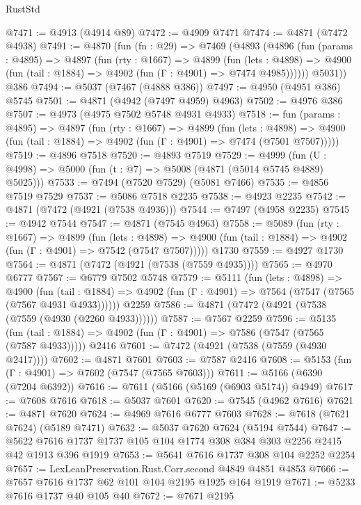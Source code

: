 \begin{lexlean}{RustStd}
\begin{coremodule}
@7471 := @4913 (@4914 @89)
@7472 := @4909 @7471
@7474 := @4871 (@7472 @4938)
@7491 := @4870
    (fun (fn : @29) =>
    @7469
      (@4893
        (@4896
          (fun (params : @4895) =>
          @4897
            (fun (rty : @1667) =>
            @4899
              (fun (lets : @4898) =>
              @4900 (fun (tail : @1884) => @4902 (fun (Γ : @4901) => @7474 @4985))))))
        @5031))
    @386
@7494 := @5037 (@7467 (@4888 @386))
@7497 := @4950 (@4951 @386) @5745
@7501 := @4871 (@4942 (@7497 @4959) @4963)
@7502 := @4976 @386
@7507 := @4973 (@4975 @7502 @5748 @4931 @4933)
@7518 := fun (params : @4895) =>
  @4897
    (fun (rty : @1667) =>
    @4899
      (fun (lets : @4898) =>
      @4900 (fun (tail : @1884) => @4902 (fun (Γ : @4901) => @7474 (@7501 @7507)))))
@7519 := @4896 @7518
@7520 := @4893 @7519
@7529 := @4999 (fun (U : @4998) => @5000 (fun (t : @7) => @5008 (@4871 (@5014 @5745 @4889) @5025)))
@7533 := @7494 (@7520 @7529) (@5081 @7466)
@7535 := @4856 @7519 @7529
@7537 := @5086 @7518 @2235
@7538 := @4923 @2235
@7542 := @4871 (@7472 (@4921 (@7538 @4936)))
@7544 := @7497 (@4958 @2235)
@7545 := @4942 @7544
@7547 := @4871 (@7545 @4963)
@7558 := @5089
    (fun (rty : @1667) =>
    @4899
      (fun (lets : @4898) =>
      @4900 (fun (tail : @1884) => @4902 (fun (Γ : @4901) => @7542 (@7547 @7507)))))
    @1730
@7559 := @4927 @1730
@7564 := @4871 (@7472 (@4921 (@7538 (@7559 @4935))))
@7565 := @4970 @6777
@7567 := @6779 @7502 @5748
@7579 := @5111
    (fun (lets : @4898) =>
    @4900
      (fun (tail : @1884) => @4902 (fun (Γ : @4901) => @7564 (@7547 (@7565 (@7567 @4931 @4933))))))
    @2259
@7586 := @4871 (@7472 (@4921 (@7538 (@7559 (@4930 (@2260 @4933))))))
@7587 := @7567 @2259
@7596 := @5135
    (fun (tail : @1884) => @4902 (fun (Γ : @4901) => @7586 (@7547 (@7565 (@7587 @4933)))))
    @2416
@7601 := @7472 (@4921 (@7538 (@7559 (@4930 @2417))))
@7602 := @4871 @7601
@7603 := @7587 @2416
@7608 := @5153 (fun (Γ : @4901) => @7602 (@7547 (@7565 @7603)))
@7611 := @5166 (@6390 (@7204 @6392))
@7616 := @7611 (@5166 (@5169 (@6903 @5174)) @4949)
@7617 := @7608 @7616
@7618 := @5037 @7601
@7620 := @7545 (@4962 @7616)
@7621 := @4871 @7620
@7624 := @4969 @7616 @6777 @7603
@7628 := @7618 (@7621 @7624) (@5189 @7471)
@7632 := @5037 @7620 @7624 (@5194 @7544)
@7647 := @5622 @7616 @1737 @1737 @105 @104 @1774 @308 @384 @303 @2256 @2415 @42 @1913 @396 @1919
@7653 := @5641 @7616 @1737 @308 @104 @2252 @2254
@7657 := LexLeanPreservation.Rust.Corr.second @4849 @4851 @4853
@7666 := @7657 @7616 @1737 @62 @101 @104 @2195 @1925 @164 @1919
@7671 := @5233 @7616 @1737 @40 @105 @40
@7672 := @7671 @2195

\end{coremodule}
\end{lexlean}
